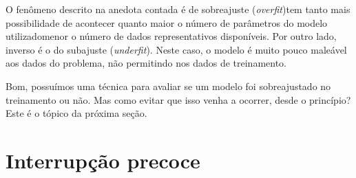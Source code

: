       \DIFaddend O fenômeno descrito na anedota contada \DIFdelbegin {}\DIFdelend é \DIFdelbegin {}\DIFdelend \DIFaddbegin {}\DIFaddend de sobreajuste (\DIFaddbegin {}\DIFaddend \textit{overfit})\DIFdelbegin {}\DIFdelend \DIFaddbegin {}\DIFaddend tem tanto mais possibilidade de acontecer quanto maior o número de parâmetros do modelo utilizado\DIFdelbegin {}\DIFdelend \DIFaddbegin {}\DIFaddend menor o número de dados representativos disponíveis. Por outro lado, \DIFdelbegin {}\DIFdelend \DIFaddbegin {}\DIFaddend inverso é o \DIFaddbegin {}\DIFaddend do subajuste (\DIFaddbegin {}\DIFaddend \textit{underfit}). Neste \DIFaddbegin {}\DIFaddend caso, o modelo é muito pouco maleável aos dados do problema, não permitindo \DIFdelbegin {}\DIFdelend \DIFaddbegin {}\DIFaddend nos dados de treinamento\DIFdelbegin {}\DIFdelend \DIFaddbegin {}\DIFaddend .

      Bom, possuímos uma técnica para avaliar se um modelo foi sobreajustado no treinamento ou não. Mas como evitar que isso venha a ocorrer, desde o princípio? Este é o tópico da próxima seção.


  \section{Interrupção precoce} \label{s:interrupcao_precoce}

